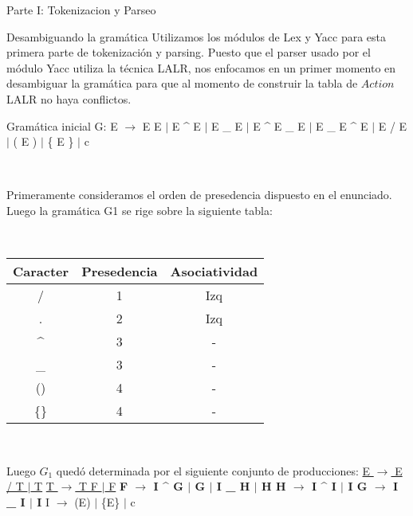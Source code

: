 \begin{section}{Parte I: Tokenizacion y Parseo}

\begin{subsection}{Desambiguando la gram\'atica}
Utilizamos los m\'odulos de Lex y Yacc para esta primera parte de tokenizaci\'on y parsing. Puesto que el parser usado por el m\'odulo Yacc utiliza la t\'ecnica LALR, nos enfocamos en un primer momento en desambiguar la gram\'atica para que al momento de construir la tabla de $Action$ LALR no haya conflictos.

Gram\'atica inicial G:
\newline E $\rightarrow$ E E 
\newline $|$ E \^{} E
\newline $|$ E \_ E
\newline $|$ E \^{} E \_ E
\newline $|$ E \_ E \^{} E
\newline $|$ E / E
\newline $|$ ( E )
\newline $|$ \{ E \}
\newline $|$ c
  
~

Primeramente consideramos el orden de presedencia dispuesto en el enunciado. Luego la gram\'atica G1 se rige sobre la siguiente tabla: 
  
~

\begin{tabular}{ c | c | c }
  			
  Caracter & Presedencia & Asociatividad \\
  \hline
  / & 1 & Izq \\
  . & 2 & Izq \\
  \^{} & 3 & - \\
  \_ & 3 & - \\
  () & 4 & - \\
  \{\} & 4 & - \\
  
\end{tabular}
  
~

Luego $G_{1}$ qued\'o determinada por el siguiente conjunto de producciones:
\newline \underline{E $\rightarrow$ E / T $|$ T}
\newline \underline{T $\rightarrow$ T F $|$ F}
\textbf{\newline F $\rightarrow$ I \^{} G $|$ G $|$ I \_ H $|$ H
\newline H $\rightarrow$ I \^{} I $|$ I
\newline G $\rightarrow$ I \_ I $|$ I}
\newline I $\rightarrow$ (E) $|$ \{E\} $|$ c
  

\end{subsection}
\end{section}
